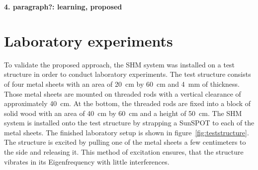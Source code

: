 \documentclass[12pt,a4paper]{scrartcl}
\begin{document}
\textbf{4. paragraph?: learning, proposed}



\newpage
\section*{Laboratory experiments}


To validate the proposed approach, the SHM system was installed on a test structure in order to conduct laboratory experiments.
The test structure consists of four metal sheets with an area of 20~cm by 60~cm and 4~mm of thickness.
Those metal sheets are mounted on threaded rods with a vertical clearance of approximately 40~cm.
At the bottom, the threaded rods are fixed into a block of solid wood with an area of 40~cm by 60~cm and a height of 50~cm.
The SHM system is installed onto the test structure by strapping a SunSPOT to each of the metal sheets.
The finished laboratory setup is shown in figure~\ref{fig:teststructure}.
The structure is excited by pulling one of the metal sheets a few centimeters to the side and releasing it.
This method of excitation ensures, that the structure vibrates in its Eigenfrequency with little interferences.
\end{document}

